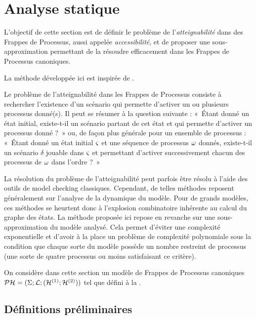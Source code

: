 
\section{Analyse statique}


L'objectif de cette section est de définir le problème de l'\emph{atteignabilité} dans des
Frappes de Processus,
aussi appelée \emph{accessibilité},
et de proposer une sous-approximation permettant de la résoudre efficacement
dans les Frappes de Processus canoniques.

La méthode développée ici est inspirée de .  %

Le problème de l'atteignabilité dans les Frappes de Processus consiste à rechercher l'existence
d'un scénario qui permette d'activer un ou plusieurs processus donné(s).
Il peut se résumer à la question suivante :
«~Étant donné un état initial, existe-t-il un scénario partant de cet état et
qui permette d'activer un processus donné ?~»
ou, de façon plus générale pour un ensemble de processus :
«~Étant donné un état initial $\varsigma$ et une séquence de processus $\omega$ donnés,
existe-t-il un scénario $\delta$ jouable dans $\varsigma$ et permettant d'activer successivement
chacun des processus de $\omega$ dans l'ordre ?~»

La résolution du problème de l'atteignabilité peut parfois être résolu à l'aide des outils
de model checking classiques.
Cependant, de telles méthodes reposent généralement sur l'analyse de la dynamique du modèle.
Pour de grands modèles, ces méthodes se heurtent donc à l'explosion combinatoire inhérente
au calcul du graphe des états.
La méthode proposée ici repose en revanche sur une sous-approximation du modèle analysé.
Cela permet d'éviter une complexité exponentielle
et d'avoir à la place un problème de complexité polynomiale
sous la condition que chaque sorte du modèle possède un nombre restreint de processus
(une sorte de quatre processus ou moins satisfaisant ce critère).

On considère dans cette section un modèle de Frappes de Processus canoniques
$\mathcal{PH} = (\Sigma; \mathcal{L}; (\mathcal{H}^{(1)};\mathcal{H}^{(2)}))$
tel que défini à la .






\subsection{Définitions préliminaires}

